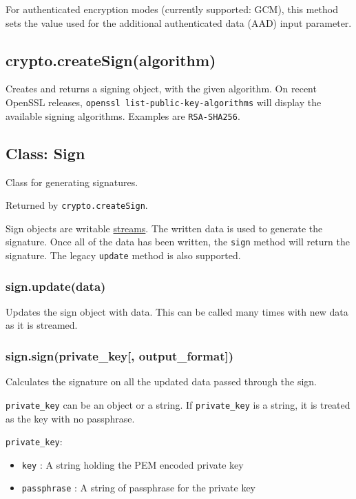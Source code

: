 For authenticated encryption modes (currently supported: GCM), this
method sets the value used for the additional authenticated data (AAD)
input parameter.

\subsection{crypto.createSign(algorithm)}\label{crypto.createsignalgorithm}

Creates and returns a signing object, with the given algorithm. On
recent OpenSSL releases, \texttt{openssl\ list-public-key-algorithms}
will display the available signing algorithms. Examples are
\texttt{\textquotesingle{}RSA-SHA256\textquotesingle{}}.

\subsection{Class: Sign}\label{class-sign}

Class for generating signatures.

Returned by \texttt{crypto.createSign}.

Sign objects are writable \href{stream.html}{streams}. The written data
is used to generate the signature. Once all of the data has been
written, the \texttt{sign} method will return the signature. The legacy
\texttt{update} method is also supported.

\subsubsection{sign.update(data)}\label{sign.updatedata}

Updates the sign object with data. This can be called many times with
new data as it is streamed.

\subsubsection{sign.sign(private\_key{[},
output\_format{]})}\label{sign.signprivateux5fkey-outputux5fformat}

Calculates the signature on all the updated data passed through the
sign.

\texttt{private\_key} can be an object or a string. If
\texttt{private\_key} is a string, it is treated as the key with no
passphrase.

\texttt{private\_key}:

\begin{itemize}
\itemsep1pt\parskip0pt
\item
  \texttt{key} : A string holding the PEM encoded private key
\item
  \texttt{passphrase} : A string of passphrase for the private key
\end{itemize}

